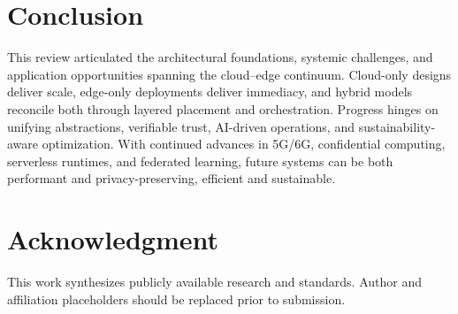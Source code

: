 \documentclass[conference]{IEEEtran}
\begin{document}
\section{Conclusion}\label{sec:conclusion}
This review articulated the architectural foundations, systemic challenges, and application opportunities spanning the cloud--edge continuum. Cloud-only designs deliver scale, edge-only deployments deliver immediacy, and hybrid models reconcile both through layered placement and orchestration. Progress hinges on unifying abstractions, verifiable trust, AI-driven operations, and sustainability-aware optimization. With continued advances in 5G/6G, confidential computing, serverless runtimes, and federated learning, future systems can be both performant and privacy-preserving, efficient and sustainable.

\section*{Acknowledgment}
This work synthesizes publicly available research and standards. Author and affiliation placeholders should be replaced prior to submission.
\end{document}
